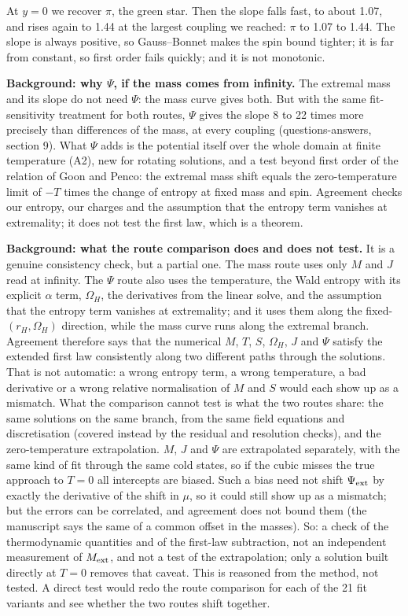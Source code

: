 \documentclass[12pt,a4paper]{article}
\begin{document}
At $y = 0$ we recover $\pi$, the green star. Then the slope falls fast, to about
1.07, and rises again to 1.44 at the largest coupling we reached: $\pi$ to 1.07
to 1.44. The slope is always positive, so Gauss--Bonnet makes the spin bound
tighter; it is far from constant, so first order fails quickly; and it is not
monotonic.

\textbf{Background: why $\Psi$, if the mass comes from infinity.} The extremal
mass and its slope do not need $\Psi$: the mass curve gives both. But with
the same fit-sensitivity treatment for both routes, $\Psi$ gives the slope 8 to
22 times more precisely than differences of the mass, at every coupling
(questions-answers, section 9). What $\Psi$ adds is the potential itself over the whole domain at finite temperature (A2),
new for rotating solutions, and a test beyond first order of the relation of
Goon and Penco: the extremal mass shift equals the zero-temperature limit of
$-T$ times the change of entropy at fixed mass and spin. Agreement checks our
entropy, our charges and the assumption that the entropy term vanishes at
extremality; it does not test the first law, which is a theorem.

\textbf{Background: what the route comparison does and does not test.} It is a
genuine consistency check, but a partial one. The mass route uses only $M$ and
$J$ read at infinity. The $\Psi$ route also uses the temperature, the Wald
entropy with its explicit $\alpha$ term, $\Omega_H$, the derivatives from the
linear solve, and the assumption that the entropy term vanishes at extremality;
and it uses them along the fixed-$(r_H, \Omega_H)$ direction, while the mass
curve runs along the extremal branch. Agreement therefore says that the
numerical $M$, $T$, $S$, $\Omega_H$, $J$ and $\Psi$ satisfy the extended first
law consistently along two different paths through the solutions. That is not
automatic: a wrong entropy term, a wrong temperature, a bad derivative or a
wrong relative normalisation of $M$ and $S$ would each show up as a mismatch.
What the comparison cannot test is what the two routes share: the same
solutions on the same branch, from the same field equations and discretisation
(covered instead by the residual and resolution checks), and the
zero-temperature extrapolation. $M$, $J$ and $\Psi$ are extrapolated separately,
with the same kind of fit through the same cold states, so if the cubic misses
the true approach to $T = 0$ all intercepts are biased. Such a bias need not
shift $\Psi_{\rm ext}$ by exactly the derivative of the shift in $\mu$, so it
could still show up as a mismatch; but the errors can be correlated, and
agreement does not bound them (the manuscript says the same of a common offset
in the masses). So: a check of the thermodynamic quantities and of the
first-law subtraction, not an independent measurement of $M_{\rm ext}$, and not a
test of the extrapolation; only a solution built directly at $T = 0$ removes
that caveat. This is reasoned from the method, not tested. A direct test would
redo the route comparison for each of the 21 fit variants and see whether the
two routes shift together.
\end{document}
